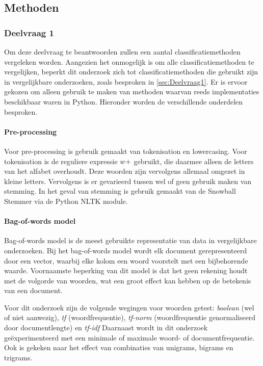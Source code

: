 \subsection{Methoden}


\subsubsection{Deelvraag 1}
Om deze deelvraag te beantwoorden zullen een aantal classificatiemethoden vergeleken worden. Aangezien het onmogelijk is om alle classificatiemethoden te vergelijken, beperkt dit onderzoek zich tot classificatiemethoden die gebruikt zijn in vergelijkbare onderzoeken, zoals besproken in \ref{sec:Deelvraag1}. Er is ervoor gekozen om alleen gebruik te maken van methoden waarvan reeds implementaties beschikbaar waren in Python. Hieronder worden de verschillende onderdelen besproken.

\paragraph{Pre-processing}
Voor pre-processing is gebruik gemaakt van tokenisation en lowercasing. Voor tokenisation is de reguliere expressie $\\w+$ gebruikt, die daarmee alleen de letters van het alfabet overhoudt. Deze woorden zijn vervolgens allemaal omgezet in kleine letters. Vervolgens is er gevarieerd tussen wel of geen gebruik maken van stemming. In het geval van stemming is gebruik gemaakt van de Snowball Stemmer via de Python NLTK module.

\paragraph{Bag-of-words model}
Bag-of-words model is de meest gebruikte representatie van data in vergelijkbare onderzoeken. Bij het bag-of-words model wordt elk document gerepresenteerd door een vector, waarbij elke kolom een woord voorstelt met een bijbehorende waarde. Voornaamste beperking van dit model is dat het geen rekening houdt met de volgorde van woorden, wat een groot effect kan hebben op de betekenis van een document.\par
Voor dit onderzoek zijn de volgende wegingen voor woorden getest: \textit{boolean} (wel of niet aanwezig), \textit{tf} (woordfrequentie), \textit{tf-norm} (woordfrequentie genormaliseerd door documentlengte) en \textit{tf-idf}
Daarnaast wordt in dit onderzoek geëxperimenteerd met een minimale of maximale woord- of documentfrequentie. Ook is gekeken naar het effect van combinaties van unigrams, bigrams en trigrams.\par

